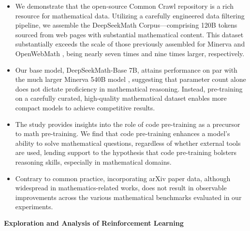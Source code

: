 \begin{itemize}[topsep=0pt]
    \item We demonstrate that the open-source Common Crawl repository is a rich resource for mathematical data. Utilizing a carefully engineered data filtering pipeline, we assemble the DeepSeekMath Corpus—comprising 120B tokens sourced from web pages with substantial mathematical content. This dataset substantially exceeds the scale of those previously assembled for Minerva \citep{minerva} and OpenWebMath \citep{openwebmath}, being nearly seven times and nine times larger, respectively.

    \item Our base model, DeepSeekMath-Base 7B, attains performance on par with the much larger Minerva 540B model \citep{minerva}, suggesting that parameter count alone does not dictate proficiency in mathematical reasoning. Instead, pre-training on a carefully curated, high-quality mathematical dataset enables more compact models to achieve competitive results.

    \item The study provides insights into the role of code pre-training as a precursor to math pre-training. We find that code pre-training enhances a model's ability to solve mathematical questions, regardless of whether external tools are used, lending support to the hypothesis that code pre-training bolsters reasoning skills, especially in mathematical domains.

    \item Contrary to common practice, incorporating arXiv paper data, although widespread in mathematics-related works, does not result in observable improvements across the various mathematical benchmarks evaluated in our experiments.
\end{itemize}

\textbf{Exploration and Analysis of Reinforcement Learning}

